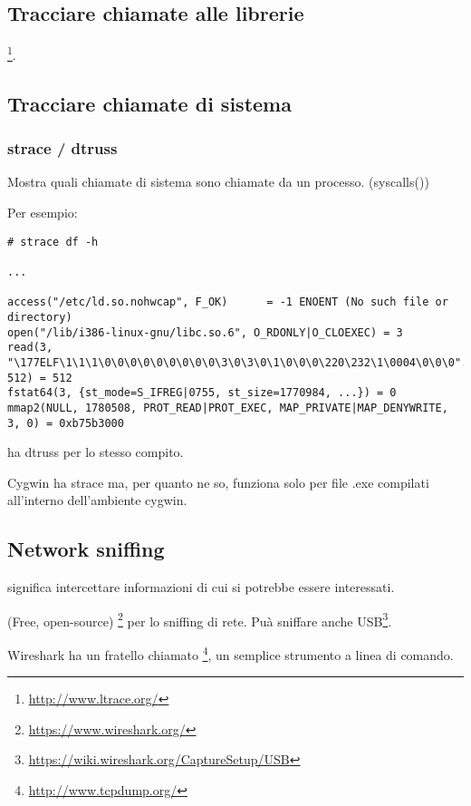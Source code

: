 \subsection{Tracciare chiamate alle librerie}

\footnote{\url{http://www.ltrace.org/}}.

\subsection{Tracciare chiamate di sistema}

\label{strace}
\subsubsection{strace / dtruss}

Mostra quali chiamate di sistema sono chiamate da un processo. (syscalls())

Per esempio:

\begin{lstlisting}
# strace df -h

...

access("/etc/ld.so.nohwcap", F_OK)      = -1 ENOENT (No such file or directory)
open("/lib/i386-linux-gnu/libc.so.6", O_RDONLY|O_CLOEXEC) = 3
read(3, "\177ELF\1\1\1\0\0\0\0\0\0\0\0\0\3\0\3\0\1\0\0\0\220\232\1\0004\0\0\0"..., 512) = 512
fstat64(3, {st_mode=S_IFREG|0755, st_size=1770984, ...}) = 0
mmap2(NULL, 1780508, PROT_READ|PROT_EXEC, MAP_PRIVATE|MAP_DENYWRITE, 3, 0) = 0xb75b3000
\end{lstlisting}

\myindex{\MacOSX}
\MacOSX ha dtruss per lo stesso compito.

Cygwin ha strace ma, per quanto ne so, funziona solo per file .exe compilati all'interno dell'ambiente
cygwin.

\subsection{Network sniffing}

 significa intercettare informazioni di cui si potrebbe essere interessati.

(Free, open-source) \footnote{\url{https://www.wireshark.org/}} per lo sniffing di rete.
Puà sniffare anche USB\footnote{\url{https://wiki.wireshark.org/CaptureSetup/USB}}.

Wireshark ha un fratello chiamato \footnote{\url{http://www.tcpdump.org/}}, un semplice strumento a linea di comando.

